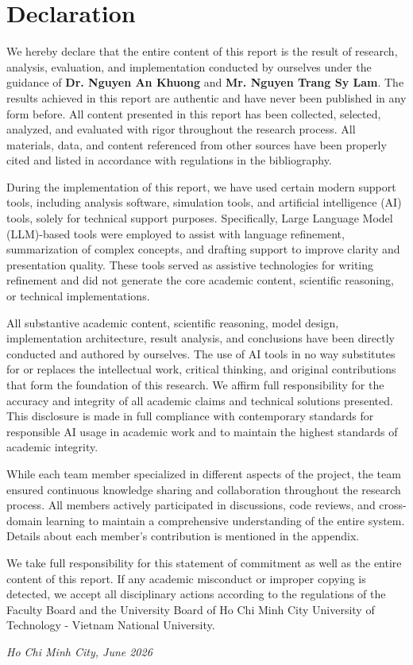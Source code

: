 \chapter*{Declaration}

We hereby declare that the entire content of this report is the result of research, analysis, evaluation, and implementation conducted by ourselves under the guidance of \textbf{Dr. Nguyen An Khuong} and \textbf{Mr. Nguyen Trang Sy Lam}. The results achieved in this report are authentic and have never been published in any form before. All content presented in this report has been collected, selected, analyzed, and evaluated with rigor throughout the research process. All materials, data, and content referenced from other sources have been properly cited and listed in accordance with regulations in the bibliography.

During the implementation of this report, we have used certain modern support tools, including analysis software, simulation tools, and artificial intelligence (AI) tools, solely for technical support purposes. Specifically, Large Language Model (LLM)-based tools were employed to assist with language refinement, summarization of complex concepts, and drafting support to improve clarity and presentation quality. These tools served as assistive technologies for writing refinement and did not generate the core academic content, scientific reasoning, or technical implementations.

All substantive academic content, scientific reasoning, model design, implementation architecture, result analysis, and conclusions have been directly conducted and authored by ourselves. The use of AI tools in no way substitutes for or replaces the intellectual work, critical thinking, and original contributions that form the foundation of this research. We affirm full responsibility for the accuracy and integrity of all academic claims and technical solutions presented. This disclosure is made in full compliance with contemporary standards for responsible AI usage in academic work and to maintain the highest standards of academic integrity.

While each team member specialized in different aspects of the project, the team ensured continuous knowledge sharing and collaboration throughout the research process. All members actively participated in discussions, code reviews, and cross-domain learning to maintain a comprehensive understanding of the entire system. Details about each member's contribution is mentioned in the appendix.

We take full responsibility for this statement of commitment as well as the entire content of this report. If any academic misconduct or improper copying is detected, we accept all disciplinary actions according to the regulations of the Faculty Board and the University Board of Ho Chi Minh City University of Technology - Vietnam National University.

\begin{flushright}
\textit{Ho Chi Minh City, June 2026}
\end{flushright}

\newpage
